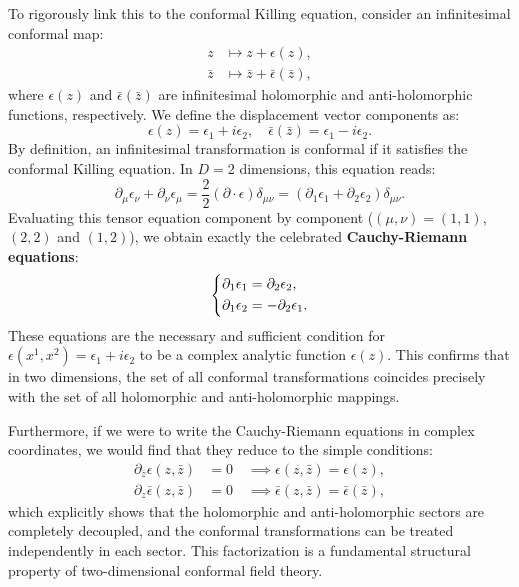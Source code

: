 To rigorously link this to the conformal Killing equation, consider an infinitesimal conformal map:
\[
    \begin{aligned}
        z       & \mapsto z + \epsilon(z),                   \\
        \bar{z} & \mapsto \bar{z} + \bar{\epsilon}(\bar{z}),
    \end{aligned}
\]
where \(\epsilon(z)\) and \(\bar{\epsilon}(\bar{z})\) are infinitesimal holomorphic and anti-holomorphic functions, respectively. We define the displacement vector components as:
\[
    \epsilon(z) = \epsilon_1 + i \epsilon_2, \quad \bar{\epsilon}(\bar{z}) = \epsilon_1 - i \epsilon_2.
\]
By definition, an infinitesimal transformation is conformal if it satisfies the conformal Killing equation. In \(D=2\) dimensions, this equation reads:
\begin{equation}
    \partial_\mu \epsilon_\nu + \partial_\nu \epsilon_\mu = \frac{2}{2} (\partial \cdot \epsilon) \delta_{\mu\nu} = (\partial_1\epsilon_1 + \partial_2\epsilon_2) \delta_{\mu\nu}.
    \label{eq:conformal_killing_equation_2d}
\end{equation}
Evaluating this tensor equation component by component (\((\mu, \nu)=(1,1)\), \((2,2)\) and \((1, 2)\)), we obtain exactly the celebrated \textbf{Cauchy-Riemann equations}:
\begin{equation}
    \begin{dcases}
        \partial_1 \epsilon_1 = \partial_2 \epsilon_2, \\
        \partial_1 \epsilon_2 = -\partial_2 \epsilon_1.
    \end{dcases}
    \label{eq:cauchy_riemann_equations_2d}
\end{equation}
These equations are the necessary and sufficient condition for \(\epsilon(x^1, x^2) = \epsilon_1 + i \epsilon_2\) to be a complex analytic function \(\epsilon(z)\). This confirms that in two dimensions, the set of all conformal transformations coincides precisely with the set of all holomorphic and anti-holomorphic mappings.

Furthermore, if we were to write the Cauchy-Riemann equations in complex coordinates, we would find that they reduce to the simple conditions:
\[
    \begin{aligned}
        \partial_{\bar{z}} \epsilon(z, \bar{z}) & = 0 \quad \implies \epsilon(z, \bar{z}) = \epsilon(z),                   \\
        \partial_z \bar{\epsilon}(z, \bar{z})   & = 0 \quad \implies \bar{\epsilon}(z, \bar{z}) = \bar{\epsilon}(\bar{z}),
    \end{aligned}
\]
which explicitly shows that the holomorphic and anti-holomorphic sectors are completely decoupled, and the conformal transformations can be treated independently in each sector. This factorization is a fundamental structural property of two-dimensional conformal field theory.

